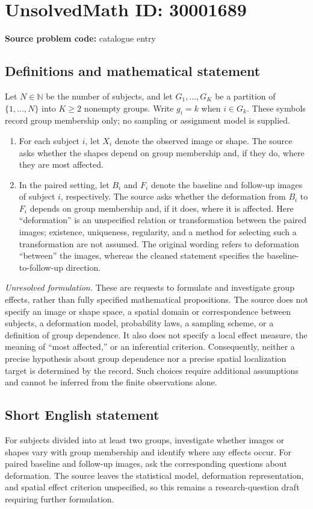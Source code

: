 \documentclass[11pt]{article}
\newcommand{\N}{\mathbb{N}}
\begin{document}
\section*{UnsolvedMath ID: 30001689}
\textbf{Source problem code:} catalogue entry
\subsection{Definitions and mathematical statement}
Let \(N\in\N\) be the number of subjects, and let \(G_1,\ldots,G_K\) be a partition of \(\{1,\ldots,N\}\) into \(K\geq2\) nonempty groups. Write \(g_i=k\) when \(i\in G_k\). These symbols record group membership only; no sampling or assignment model is supplied.

\begin{enumerate}
\item For each subject \(i\), let \(X_i\) denote the observed image or shape. The source asks whether the shapes depend on group membership and, if they do, where they are most affected.
\item In the paired setting, let \(B_i\) and \(F_i\) denote the baseline and follow-up images of subject \(i\), respectively. The source asks whether the deformation from \(B_i\) to \(F_i\) depends on group membership and, if it does, where it is affected. Here ``deformation'' is an unspecified relation or transformation between the paired images; existence, uniqueness, regularity, and a method for selecting such a transformation are not assumed. The original wording refers to deformation ``between'' the images, whereas the cleaned statement specifies the baseline-to-follow-up direction.
\end{enumerate}

\textit{Unresolved formulation.} These are requests to formulate and investigate group effects, rather than fully specified mathematical propositions. The source does not specify an image or shape space, a spatial domain or correspondence between subjects, a deformation model, probability laws, a sampling scheme, or a definition of group dependence. It also does not specify a local effect measure, the meaning of ``most affected,'' or an inferential criterion. Consequently, neither a precise hypothesis about group dependence nor a precise spatial localization target is determined by the record. Such choices require additional assumptions and cannot be inferred from the finite observations alone.
\subsection{Short English statement}
For subjects divided into at least two groups, investigate whether images or shapes vary with group membership and identify where any effects occur. For paired baseline and follow-up images, ask the corresponding questions about deformation. The source leaves the statistical model, deformation representation, and spatial effect criterion unspecified, so this remains a research-question draft requiring further formulation.
\end{document}
